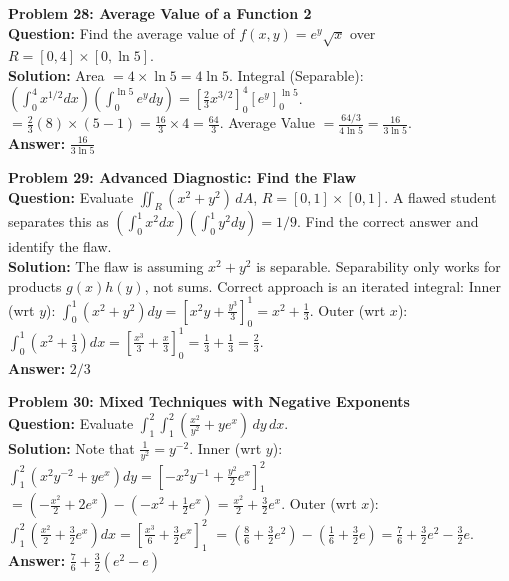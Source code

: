 \documentclass[11pt]{article}
\begin{document}
\vspace{0.5cm}
\noindent\textbf{Problem 28: Average Value of a Function 2} \\
\textbf{Question:} Find the average value of $f(x,y) = e^y \sqrt{x}$ over $R = [0,4] \times [0,\ln 5]$. \\
\textbf{Solution:} Area $= 4 \times \ln 5 = 4\ln 5$.
Integral (Separable): $\left(\int_0^4 x^{1/2} dx\right)\left(\int_0^{\ln 5} e^y dy\right) = \left[\frac{2}{3}x^{3/2}\right]_0^4 \left[e^y\right]_0^{\ln 5}$.
$= \frac{2}{3}(8) \times (5 - 1) = \frac{16}{3} \times 4 = \frac{64}{3}$.
Average Value $= \frac{64/3}{4\ln 5} = \frac{16}{3\ln 5}$. \\
\textbf{Answer:} $\frac{16}{3\ln 5}$

\vspace{0.5cm}
\noindent\textbf{Problem 29: Advanced Diagnostic: Find the Flaw} \\
\textbf{Question:} Evaluate $\iint_R (x^2+y^2) \, dA$, $R = [0,1] \times [0,1]$. A flawed student separates this as $\left(\int_0^1 x^2 dx\right)\left(\int_0^1 y^2 dy\right) = 1/9$. Find the correct answer and identify the flaw. \\
\textbf{Solution:} The flaw is assuming $x^2+y^2$ is separable. Separability only works for products $g(x)h(y)$, not sums.
Correct approach is an iterated integral:
Inner (wrt $y$): $\int_0^1 (x^2 + y^2) dy = \left[ x^2 y + \frac{y^3}{3} \right]_0^1 = x^2 + \frac{1}{3}$.
Outer (wrt $x$): $\int_0^1 (x^2 + \frac{1}{3}) dx = \left[ \frac{x^3}{3} + \frac{x}{3} \right]_0^1 = \frac{1}{3} + \frac{1}{3} = \frac{2}{3}$. \\
\textbf{Answer:} $2/3$

\vspace{0.5cm}
\noindent\textbf{Problem 30: Mixed Techniques with Negative Exponents} \\
\textbf{Question:} Evaluate $\int_1^2 \int_1^2 \left( \frac{x^2}{y^2} + y e^x \right) \, dy \, dx$. \\
\textbf{Solution:} Note that $\frac{1}{y^2} = y^{-2}$. 
Inner (wrt $y$): $\int_1^2 (x^2 y^{-2} + y e^x) dy = \left[ -x^2 y^{-1} + \frac{y^2}{2} e^x \right]_1^2$
$= \left( -\frac{x^2}{2} + 2e^x \right) - \left( -x^2 + \frac{1}{2}e^x \right) = \frac{x^2}{2} + \frac{3}{2}e^x$.
Outer (wrt $x$): $\int_1^2 \left( \frac{x^2}{2} + \frac{3}{2}e^x \right) dx = \left[ \frac{x^3}{6} + \frac{3}{2}e^x \right]_1^2$
$= \left( \frac{8}{6} + \frac{3}{2}e^2 \right) - \left( \frac{1}{6} + \frac{3}{2}e \right) = \frac{7}{6} + \frac{3}{2}e^2 - \frac{3}{2}e$. \\
\textbf{Answer:} $\frac{7}{6} + \frac{3}{2}(e^2 - e)$
\end{document}
